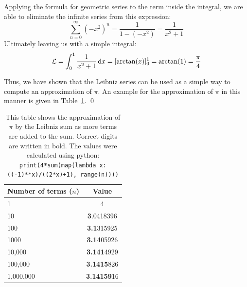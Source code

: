 \documentclass[11pt, a4paper]{article} %
\begin{document}
Applying the formula for geometric series to the term inside the integral, we are able to eliminate the infinite series from this expression:
$$\sum_{n=0}^\infty(-x^2)^n = \frac{1}{1-(-x^2)} = \frac{1}{x^2 + 1}$$
Ultimately leaving us with a simple integral:
$$\mathcal{L} = \int_0^1 \frac{1}{x^2 + 1} \idx
= [\arctan(x)]^1_0 %
= \arctan(1)
= \frac{\pi}{4}
$$

Thus, we have shown that the Leibniz series can be used as a simple way to compute an approximation of $\pi$.
An example for the approximation of $\pi$ in this manner is given in Table~\ref{tab-pi}.
\qed


\begin{table}[hb] 
	\caption{This table shows the approximation of $\pi$ by the Leibniz sum as more terms are added to the sum.
	Correct digits are written in bold.
	The values were calculated using python: \texttt{print(4*sum(map(lambda x: ((-1)**x)/((2*x)+1), range(n))))}
	}
	\label{tab-pi}
	\centering %
	\begin{tabular}{l | c } %
		Number of terms ($n$) & Value\\ %
		\hline %
		1 & 4\\
		10 & \textbf{3}.0418396\\
		100 & \textbf{3.1}315925\\
		1000 & \textbf{3.14}05926\\
		10,000 & \textbf{3.141}4929\\
		100,000 & \textbf{3.1415}826\\
		1,000,000 & \textbf{3.14159}16\\
		
	\end{tabular}
\end{table}
\end{document}
